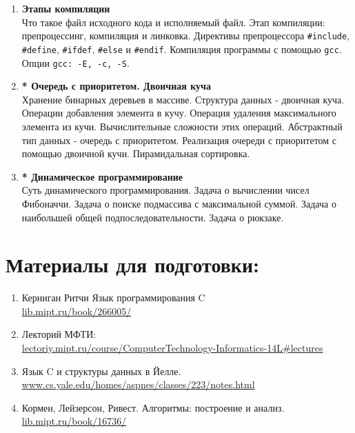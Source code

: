 \documentclass{article}
\begin{document}
\begin{enumerate}
\item \textbf{Этапы компиляции}\\
Что такое файл исходного кода и исполняемый файл. Этап компиляции: препроцессинг, компиляция и линковка. Директивы препроцессора \texttt{\#include}, \texttt{\#define}, \texttt{\#ifdef}, \texttt{\#else} и \texttt{\#endif}. Компиляция программы с помощью \texttt{gcc}. Опции \texttt{gcc: -E, -c, -S}.


\item \textbf{* Очередь с приоритетом. Двоичная куча}\\
Хранение бинарных деревьев в массиве. Структура данных - двоичная куча. Операции добавления элемента в кучу. Операция удаления максимального элемента из кучи. Вычислительные сложности этих операций. Абстрактный тип данных - очередь с приоритетом. Реализация очереди с приоритетом с помощью двоичной кучи. Пирамидальная сортировка.

\item \textbf{* Динамическое программирование}\\
Суть динамического программирования. Задача о вычислении чисел Фибоначчи. Задача о поиске подмассива с максимальной суммой. Задача о наибольшей общей подпоследовательности. Задача о рюкзаке. 
\fi
\end{enumerate}



\newpage
\section*{Материалы для подготовки:}
\begin{enumerate}
\item Керниган Ритчи Язык программирования C \\
\hspace*{16pt} \href{https://lib.mipt.ru/book/266005/}{lib.mipt.ru/book/266005/}
\item Лекторий МФТИ: \\ \hspace*{16pt} 
\href{http://lectoriy.mipt.ru/course/ComputerTechnology-Informatics-14L#lectures}
{lectoriy.mipt.ru/course/ComputerTechnology-Informatics-14L\#lectures}
\item Язык C и структуры данных в Йелле.\\ \hspace*{16pt} \href{http://www.cs.yale.edu/homes/aspnes/classes/223/notes.html}{www.cs.yale.edu/homes/aspnes/classes/223/notes.html}

\item Кормен, Лейзерсон, Ривест. Алгоритмы: построение и анализ.\\ 
\hspace*{16pt} \href{https://lib.mipt.ru/book/16736/}{lib.mipt.ru/book/16736/}
\end{enumerate}
\end{document}
